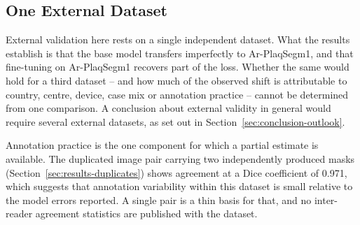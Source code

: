\subsection{One External Dataset}

External validation here rests on a single independent dataset. What the results establish is
that the base model transfers imperfectly to Ar-PlaqSegm1, and that fine-tuning on Ar-PlaqSegm1
recovers part of the loss. Whether the same would hold for a third dataset -- and how much of the
observed shift is attributable to country, centre, device, case mix or annotation practice --
cannot be determined from one comparison. A conclusion about external validity in general would
require several external datasets, as set out in Section~\ref{sec:conclusion-outlook}.

Annotation practice is the one component for which a partial estimate is available. The
duplicated image pair carrying two independently produced masks
(Section~\ref{sec:results-duplicates}) shows agreement at a Dice coefficient of 0.971, which
suggests that annotation variability within this dataset is small relative to the model errors
reported. A single pair is a thin basis for that, and no inter-reader agreement statistics are
published with the dataset.
